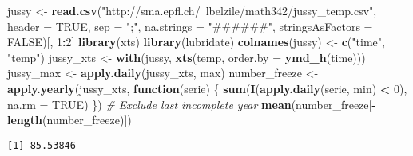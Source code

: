 \documentclass[]{book}
\newenvironment{Shaded}{\begin{snugshade}}{\end{snugshade}}
\newcommand{\CommentTok}[1]{\textcolor[rgb]{0.56,0.35,0.01}{\textit{#1}}}
\newcommand{\ControlFlowTok}[1]{\textcolor[rgb]{0.13,0.29,0.53}{\textbf{#1}}}
\newcommand{\DataTypeTok}[1]{\textcolor[rgb]{0.13,0.29,0.53}{#1}}
\newcommand{\DecValTok}[1]{\textcolor[rgb]{0.00,0.00,0.81}{#1}}
\newcommand{\KeywordTok}[1]{\textcolor[rgb]{0.13,0.29,0.53}{\textbf{#1}}}
\newcommand{\NormalTok}[1]{#1}
\newcommand{\OperatorTok}[1]{\textcolor[rgb]{0.81,0.36,0.00}{\textbf{#1}}}
\newcommand{\OtherTok}[1]{\textcolor[rgb]{0.56,0.35,0.01}{#1}}
\newcommand{\StringTok}[1]{\textcolor[rgb]{0.31,0.60,0.02}{#1}}
\begin{document}
\begin{Shaded}
\begin{Highlighting}[]
\NormalTok{jussy <-}\StringTok{ }\KeywordTok{read.csv}\NormalTok{(}\StringTok{"http://sma.epfl.ch/~lbelzile/math342/jussy_temp.csv"}\NormalTok{, }\DataTypeTok{header =} \OtherTok{TRUE}\NormalTok{, }
    \DataTypeTok{sep =} \StringTok{";"}\NormalTok{, }\DataTypeTok{na.strings =} \StringTok{"######"}\NormalTok{, }\DataTypeTok{stringsAsFactors =} \OtherTok{FALSE}\NormalTok{)[, }\DecValTok{1}\OperatorTok{:}\DecValTok{2}\NormalTok{]}
\KeywordTok{library}\NormalTok{(xts)}
\KeywordTok{library}\NormalTok{(lubridate)}
\KeywordTok{colnames}\NormalTok{(jussy) <-}\StringTok{ }\KeywordTok{c}\NormalTok{(}\StringTok{"time"}\NormalTok{, }\StringTok{"temp"}\NormalTok{)}
\NormalTok{jussy_xts <-}\StringTok{ }\KeywordTok{with}\NormalTok{(jussy, }\KeywordTok{xts}\NormalTok{(temp, }\DataTypeTok{order.by =} \KeywordTok{ymd_h}\NormalTok{(time)))}
\NormalTok{jussy_max <-}\StringTok{ }\KeywordTok{apply.daily}\NormalTok{(jussy_xts, max)}
\NormalTok{number_freeze <-}\StringTok{ }\KeywordTok{apply.yearly}\NormalTok{(jussy_xts, }\ControlFlowTok{function}\NormalTok{(serie) \{}
    \KeywordTok{sum}\NormalTok{(}\KeywordTok{I}\NormalTok{(}\KeywordTok{apply.daily}\NormalTok{(serie, min) }\OperatorTok{<}\StringTok{ }\DecValTok{0}\NormalTok{), }\DataTypeTok{na.rm =} \OtherTok{TRUE}\NormalTok{)}
\NormalTok{\})}
\CommentTok{# Exclude last incomplete year}
\KeywordTok{mean}\NormalTok{(number_freeze[}\OperatorTok{-}\KeywordTok{length}\NormalTok{(number_freeze)])}
\end{Highlighting}
\end{Shaded}

\begin{verbatim}
[1] 85.53846
\end{verbatim}

\begin{Shaded}
\end{Shaded}
\end{document}
